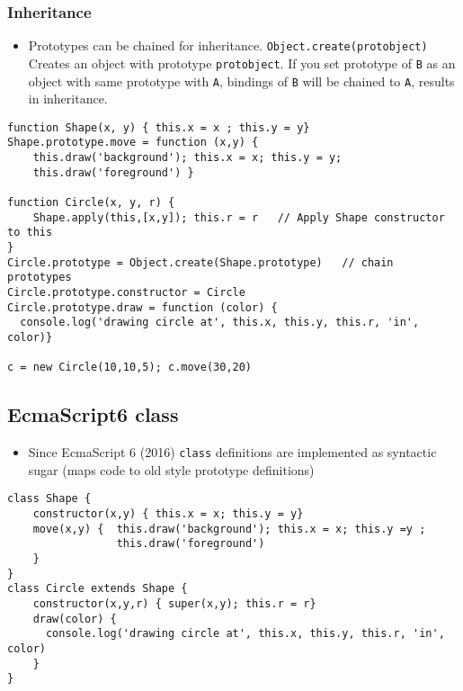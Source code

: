 \documentclass[trans,compress,xcolor=table]{beamer}
\begin{document}
\begin{frame}[fragile]
\frametitle{Inheritance}
\begin{itemize}
\item Prototypes can be chained for inheritance. \lstinline!Object.create(protobject)!
Creates an object with prototype \lstinline!protobject!. If you set prototype of
\lstinline!B! as an object with same prototype with \lstinline!A!, bindings of \lstinline!B! will be chained to \lstinline!A!, results in inheritance.
\end{itemize}
\begin{lstlisting}
function Shape(x, y) { this.x = x ; this.y = y} 
Shape.prototype.move = function (x,y) { 
	this.draw('background'); this.x = x; this.y = y;
	this.draw('foreground') }

function Circle(x, y, r) { 
	Shape.apply(this,[x,y]); this.r = r   // Apply Shape constructor to this
}
Circle.prototype = Object.create(Shape.prototype)	// chain prototypes
Circle.prototype.constructor = Circle
Circle.prototype.draw = function (color) {
  console.log('drawing circle at', this.x, this.y, this.r, 'in', color)}

c = new Circle(10,10,5); c.move(30,20)
\end{lstlisting}
\end{frame}

\subsection{EcmaScript6 class}
\begin{frame}[fragile]
\begin{itemize}
\item Since EcmaScript 6 (2016) \lstinline!class! definitions are implemented as
syntactic sugar (maps code to old style prototype definitions)
\end{itemize}
\begin{lstlisting}
class Shape {
	constructor(x,y) { this.x = x; this.y = y}
    move(x,y) {  this.draw('background'); this.x = x; this.y =y ; 
				 this.draw('foreground')
	}
}
class Circle extends Shape {
	constructor(x,y,r) { super(x,y); this.r = r}
	draw(color) { 
	  console.log('drawing circle at', this.x, this.y, this.r, 'in', color)
	}
}
\end{lstlisting}
\end{frame}
\end{document}
